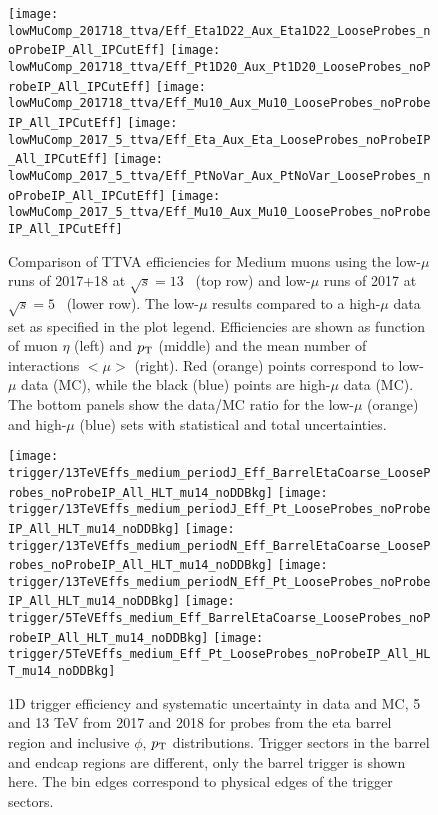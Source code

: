 	\begin{figure}  \centering
		\texttt{[image: lowMuComp\_201718\_ttva/Eff\_Eta1D22\_Aux\_Eta1D22\_LooseProbes\_noProbeIP\_All\_IPCutEff]}%
		\texttt{[image: lowMuComp\_201718\_ttva/Eff\_Pt1D20\_Aux\_Pt1D20\_LooseProbes\_noProbeIP\_All\_IPCutEff]}
		\texttt{[image: lowMuComp\_201718\_ttva/Eff\_Mu10\_Aux\_Mu10\_LooseProbes\_noProbeIP\_All\_IPCutEff]}%
		\texttt{[image: lowMuComp\_2017\_5\_ttva/Eff\_Eta\_Aux\_Eta\_LooseProbes\_noProbeIP\_All\_IPCutEff]}
		\texttt{[image: lowMuComp\_2017\_5\_ttva/Eff\_PtNoVar\_Aux\_PtNoVar\_LooseProbes\_noProbeIP\_All\_IPCutEff]}%
		\texttt{[image: lowMuComp\_2017\_5\_ttva/Eff\_Mu10\_Aux\_Mu10\_LooseProbes\_noProbeIP\_All\_IPCutEff]}
	
		\caption{Comparison of TTVA efficiencies for Medium muons using the
			low-$\mu$ runs of 2017+18 at $\sqrt{s}=13$~\TeV{} (top row) and
			low-$\mu$ runs of 2017 at $\sqrt{s}=5$~\TeV{} (lower row).
			The low-$\mu$ results compared to a high-$\mu$ data set as specified in the plot legend.
			Efficiencies are shown as function of muon $\eta$ (left) and
			$p_{\text{T}}$ (middle) and the mean number of interactions $<\mu>$
			(right). Red (orange) points correspond to low-$\mu$ data (MC),
			while the black (blue) points are high-$\mu$ data (MC). The bottom
			panels show the data/MC ratio for the low-$\mu$ (orange) and
			high-$\mu$ (blue) sets with statistical and total
			uncertainties.}\label{app:fig:ttva-lowMu1}
	\end{figure}
	\begin{figure}
		\centering
		\texttt{[image: trigger/13TeVEffs\_medium\_periodJ\_Eff\_BarrelEtaCoarse\_LooseProbes\_noProbeIP\_All\_HLT\_mu14\_noDDBkg]}
		\texttt{[image: trigger/13TeVEffs\_medium\_periodJ\_Eff\_Pt\_LooseProbes\_noProbeIP\_All\_HLT\_mu14\_noDDBkg]}
		\texttt{[image: trigger/13TeVEffs\_medium\_periodN\_Eff\_BarrelEtaCoarse\_LooseProbes\_noProbeIP\_All\_HLT\_mu14\_noDDBkg]}
		\texttt{[image: trigger/13TeVEffs\_medium\_periodN\_Eff\_Pt\_LooseProbes\_noProbeIP\_All\_HLT\_mu14\_noDDBkg]}
		\texttt{[image: trigger/5TeVEffs\_medium\_Eff\_BarrelEtaCoarse\_LooseProbes\_noProbeIP\_All\_HLT\_mu14\_noDDBkg]}
		\texttt{[image: trigger/5TeVEffs\_medium\_Eff\_Pt\_LooseProbes\_noProbeIP\_All\_HLT\_mu14\_noDDBkg]}
		
		\caption{1D trigger efficiency and systematic uncertainty in data and MC, 5 and 13 TeV from 2017 and 2018 for probes from the eta barrel region and inclusive $\phi$, $p_{\text{T}}$ distributions. Trigger sectors in the barrel and endcap regions are different, only the barrel trigger is shown here. The bin edges correspond to physical edges of the trigger sectors. } \label{trig:1d2018}
	\end{figure}

